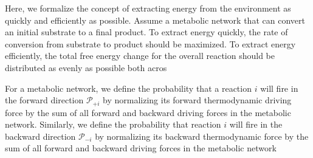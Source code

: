 Here, we formalize the concept of extracting energy from the environment as quickly and efficiently as possible. Assume a metabolic network that can convert an initial substrate to a final product. To extract energy quickly, the rate of conversion from substrate to product should be maximized.  To extract energy efficiently, the total free energy change for the overall reaction should be distributed as evenly as possible both acros


For a metabolic network, we define the probability that a reaction $i$ will fire in the forward  direction ${\mathcal P_{+i}}$ by normalizing its forward thermodynamic driving force by the sum of all forward and backward driving forces in the metabolic network. Similarly, we define the probability that reaction $i$ will fire in the backward direction $\mathcal P_{-i}$ by normalizing its backward thermodynamic force by  the sum of all forward and backward driving forces in the metabolic network